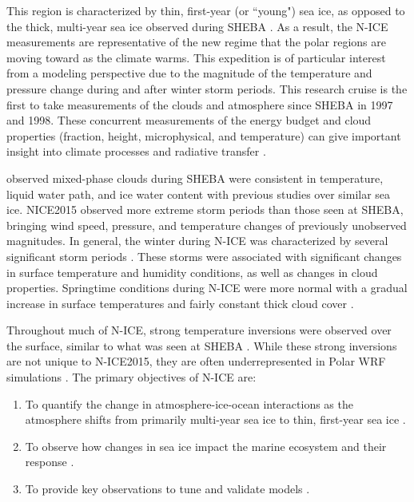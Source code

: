 This region is characterized by thin, first-year (or ``young") sea ice, as opposed to the thick, multi-year sea ice observed during SHEBA \citep{cohen:2017}. As a result, the N-ICE measurements are representative of the new regime that the polar regions are moving toward as the climate warms. This expedition is of particular interest from a modeling perspective due to the magnitude of the temperature and pressure change during and after winter storm periods. This research cruise is the first to take measurements of the clouds and atmosphere since SHEBA in 1997 and 1998. These concurrent measurements of the energy budget and cloud properties (fraction, height, microphysical, and temperature) can give important insight into climate processes and radiative transfer \citep{persson:2002, schweiger:2004}. 

\citet{shupe:2004} observed mixed-phase clouds during SHEBA were consistent in temperature, liquid water path, and ice water content with previous studies over similar sea ice. NICE2015 observed more extreme storm periods than those seen at SHEBA, bringing wind speed, pressure, and temperature changes of previously unobserved magnitudes. In general, the winter during N-ICE was characterized by several significant storm periods \citep{cohen:2017}. These storms were associated with significant changes in surface temperature and humidity conditions, as well as changes in cloud properties. Springtime conditions during N-ICE were more normal with a gradual increase in surface temperatures and fairly constant thick cloud cover \citep{cohen:2017}.

Throughout much of N-ICE, strong temperature inversions were observed over the surface, similar to what was seen at SHEBA \citep{kayser:2017}. While these strong inversions are not unique to N-ICE2015, they are often underrepresented in Polar WRF simulations \citep{hines:2015}. 
\newline 
\noindent The primary objectives of N-ICE are:
\begin{enumerate}
    \item To quantify the change in atmosphere-ice-ocean interactions as the atmosphere shifts from primarily multi-year sea ice to thin, first-year sea ice \citep{granskog:2018, granskog:2015}. 
    \item To observe how changes in sea ice impact the marine ecosystem and their response \citep{granskog:2015}.
    \item To provide key observations to tune and validate models \citep{granskog:2018, granskog:2015}.
\end{enumerate}

